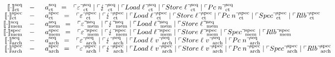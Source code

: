\documentclass[12pt]{article}
\newcommand{\ccseqct}{\ensuremath\llbracket\cdot\rrbracket^{\text{seq}}_{\text{ct}}}
\newcommand{\ccseqmem}{\ensuremath\llbracket\cdot\rrbracket^{\text{seq}}_{\text{mem}}}
\newcommand{\ccspecmem}{\ensuremath\llbracket\cdot\rrbracket^{\text{spec}}_{\text{mem}}}
\newcommand{\ccspecct}{\ensuremath\llbracket\cdot\rrbracket^{\text{spec}}_{\text{ct}}}
\newcommand{\ccseqarch}{\ensuremath\llbracket\cdot\rrbracket^{\text{seq}}_{\text{arch}}}
\newcommand{\ccspecarch}{\ensuremath\llbracket\cdot\rrbracket^{\text{spec}}_{\text{arch}}}
\begin{document}
\[
  \begin{array}{rcl}
  \ccseqct &-&
    \begin{array}{rcl}
      \seqctEvent & = & \seqctev{\emptyevent} \mid %
                        \seqctev{\lightning} \mid %
                        \seqctev{Load\;\varLoc} \mid %
                        \seqctev{Store\;\varLoc} \mid %
                        \seqctev{Pc\;n}
    \end{array} \\
  \ccspecct &-&
    \begin{array}{rcl}
      \specctEvent & = & \specctev{\emptyevent} \mid %
                         \specctev{\lightning} \mid %
                         \specctev{Load\;\varLoc} \mid %
                         \specctev{Store\;\varLoc} \mid %
                         \specctev{Pc\;n} \mid %
                         \specctev{Spec} \mid %
                         \specctev{Rlb} 
    \end{array} \\
  \ccseqmem &-&
    \begin{array}{rcl}
      \seqmemEvent & = & \seqmemev{\emptyevent} \mid %
                         \seqmemev{\lightning} \mid %
                         \seqmemev{Load\;\varLoc} \mid %
                         \seqmemev{Store\;\varLoc}
    \end{array} \\
  \ccspecmem &-&
    \begin{array}{rcl}
      \specmemEvent & = & \specmemev{\emptyevent} \mid %
                          \specmemev{\lightning} \mid %
                          \specmemev{Load\;\varLoc} \mid %
                          \specmemev{Store\;\varLoc} \mid %
                          \specmemev{Spec} \mid %
                          \specmemev{Rlb} 
    \end{array} \\
  \ccseqarch &-&
    \begin{array}{rcl}
      \seqarchEvent & = & \seqarchev{\emptyevent} \mid %
                          \seqarchev{\lightning} \mid %
                          \seqarchev{Load\;\varLoc\;v} \mid %
                          \seqarchev{Store\;\varLoc\;v} \mid %
                          \seqarchev{Pc\;n}
    \end{array} \\
  \ccspecarch &-&
    \begin{array}{rcl}
      \specarchEvent & = & \specarchev{\emptyevent} \mid %
                           \specarchev{\lightning} \mid %
                           \specarchev{Load\;\varLoc\;v} \mid %
                           \specarchev{Store\;\varLoc\;v} \mid %
                           \specarchev{Pc\;n} \mid %
                           \specarchev{Spec} \mid %
                           \specarchev{Rlb} 
    \end{array} \\
  \end{array}
\]
\end{document}
